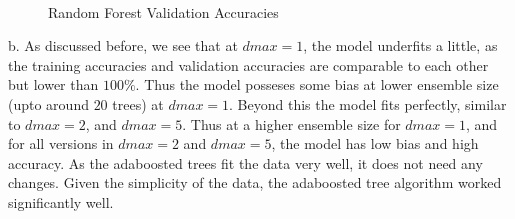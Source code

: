 \documentclass{article}
\begin{document}
\begin{figure}[H]
    \centering
    \\
\caption{Random Forest Validation Accuracies}
    \label{fig:Adaboost}%
\end{figure}

b. As discussed before, we see that at $dmax=1$, the model underfits a little, as the training accuracies and validation accuracies are comparable to each other but lower than $100\%$. Thus the model posseses some bias at lower ensemble size (upto around $20$ trees) at $dmax=1$. Beyond this the model fits perfectly, similar to $dmax=2$, and $dmax=5$. Thus at a higher ensemble size for $dmax=1$, and for all versions in $dmax=2$ and $dmax=5$, the model has low bias and high accuracy. As the adaboosted trees fit the data very well, it does not need any changes. Given the simplicity of the data, the adaboosted tree algorithm worked significantly well.
\end{document}
